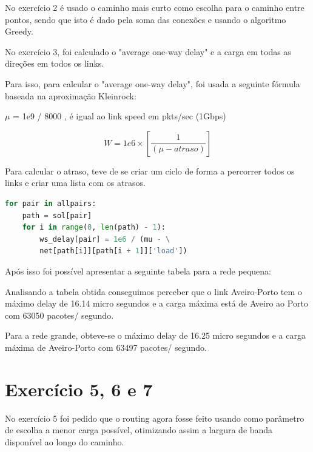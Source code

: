 \documentclass[pdftex,12pt,a4paper]{report}
\begin{document}
No exercício 2 é usado o caminho mais curto como escolha para o caminho entre pontos, sendo que isto é dado pela soma das conexões e usando o algoritmo Greedy.

No exercício 3, foi calculado o "average one-way delay" e a carga em todas as direções em todos os links.

Para isso, para calcular o "average one-way delay", foi usada a seguinte fórmula baseada na aproximação Kleinrock:

$\mu$ = 1e9 / 8000 , é igual ao link speed em pkts/sec (1Gbps)

\[W = 1e6\times\left[\frac{1}{\left(\mu-atraso\right)}\right]\]

Para calcular o atraso, teve de se criar um ciclo de forma a percorrer todos os links e criar uma lista com os atrasos.

\begin{lstlisting}[language=python]
for pair in allpairs:
    path = sol[pair]
    for i in range(0, len(path) - 1):
        ws_delay[pair] = 1e6 / (mu - \
        net[path[i]][path[i + 1]]['load'])
\end{lstlisting}

Após isso foi possível apresentar a seguinte tabela para a rede pequena:



Analisando a tabela obtida conseguimos perceber que o link Aveiro-Porto tem o máximo delay de 16.14 micro segundos e a carga máxima está de Aveiro ao Porto com 63050 pacotes/ segundo.





Para a rede grande, obteve-se o máximo delay de 16.25 micro segundos e a carga máxima de Aveiro-Porto com 63497 pacotes/ segundo.





\newpage

\section{Exercício 5, 6 e 7}

No exercício 5 foi pedido que o routing agora fosse feito usando como parâmetro de escolha a menor carga possível, otimizando assim a largura de banda disponível  ao longo do caminho.
\end{document}
